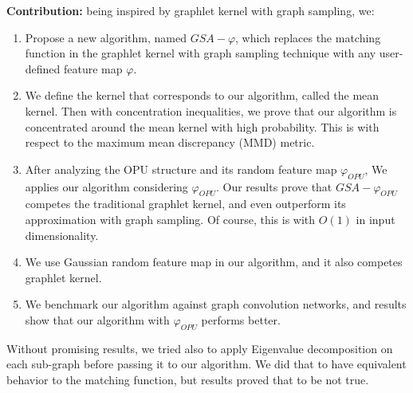 \textbf{Contribution:} being inspired by graphlet kernel with graph sampling, we:
\begin{enumerate}
    \item Propose a new algorithm, named $GSA-\varphi$, which replaces the matching function in the graphlet kernel with graph sampling technique with any user-defined feature map $\varphi$.
    \item We define the kernel that corresponds to our algorithm, called the mean kernel. Then with concentration inequalities, we prove that our algorithm is concentrated around the mean kernel with high probability. This is with respect to the maximum mean discrepancy (MMD) metric.
    \item After analyzing the OPU structure and its random feature map $\varphi_{OPU}$, We applies our algorithm considering $\varphi_{OPU}$. Our results prove that $GSA-\varphi_{OPU}$ competes the traditional graphlet kernel, and even outperform its approximation with graph sampling. Of course, this is with $O(1)$ in input dimensionality.
    \item We use Gaussian random feature map in our algorithm, and it also competes graphlet kernel.
    \item We benchmark our algorithm against graph convolution networks, and results show that our algorithm with $\varphi_{OPU}$ performs better.
\end{enumerate}

Without promising results, we tried also to apply Eigenvalue decomposition on each sub-graph before passing it to our algorithm. We did that to have equivalent behavior to the matching function, but results proved that to be not true.

